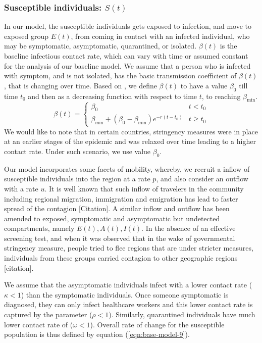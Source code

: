 \documentclass[authoryear,preprint]{elsarticle}
\begin{document}
\subsubsection{Susceptible individuals: $S(t)$}
In our model, the susceptible individuals gets exposed to infection, and move to exposed group $E(t)$, from coming in contact with an infected individual, who may be symptomatic, asymptomatic, quarantined, or isolated. $\beta(t)$ is the baseline infectious contact rate, which can vary with time or assumed constant for the analysis of our baseline model. We assume that a person who is infected with symptom, and is not isolated, has the basic transmission coefficient of $\beta(t)$, that is changing over time. Based on \cite{TANG2020248, EIKENBERRY2020293}, we define $\beta(t)$ to have a value $\beta_0$ till time $t_0$ and then as a decreasing function with respect to time $t$, to reaching $\beta_{\min}$. 
\begin{equation}
\beta(t) = 
\begin{cases}
\beta_0 & t < t_0 \\
\beta_{\min} + \left( \beta_0 - \beta_{\min}\right) e^{-r\left( t - t_0\right) } & t \geq t_0
\end{cases}
\label{eqn:base-model-11}
\end{equation}
We would like to note that in certain countries, stringency measures were in place at an earlier stages of the epidemic and was relaxed over time leading to a higher contact rate. Under such scenario, we use value $\beta_0$. 

Our model incorporates some facets of mobility, whereby, we recruit a inflow of susceptible individuals into the region at a rate $p$, and also consider an outflow with a rate $u$. It is well known that such inflow of travelers in the community including regional migration, immigration and emigration has lead to faster spread of the contagion [Citation]. A similar inflow and outflow has been amended to exposed, symptomatic and  asymptomatic but undetected compartments, namely $E(t), A(t), I(t)$. In the absence of an effective screening test, and when it was observed that in the wake of governmental stringency measure, people tried to flee regions that are under stricter measures, individuals from these  groups carried contagion to other geographic regions [citation]. 

We assume that the asymptomatic individuals infect with a lower contact rate ($\kappa < 1$) than the symptomatic individuals. Once someone symptomatic is diagnosed, they can only infect healthcare workers and this lower contact rate is captured by the parameter ($\rho < 1$). Similarly, quarantined individuals have much lower contact rate of ($\omega < 1$). Overall rate of change for the susceptible population is thus defined by equation (\ref{eqn:base-model-9}).
\end{document}
